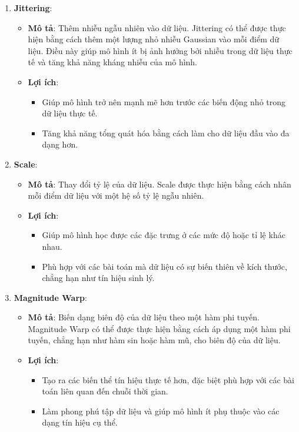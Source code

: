 \begin{enumerate}

\item \textbf{Jittering}: 
\begin{itemize}
\item \textbf{Mô tả}: Thêm nhiễu ngẫu nhiên vào dữ liệu. Jittering có thể được thực hiện bằng cách thêm một lượng nhỏ nhiễu Gaussian vào mỗi điểm dữ liệu. Điều này giúp mô hình ít bị ảnh hưởng bởi nhiễu trong dữ liệu thực tế và tăng khả năng kháng nhiễu của mô hình.
\item \textbf{Lợi ích}: 
\begin{itemize}
\item Giúp mô hình trở nên mạnh mẽ hơn trước các biến động nhỏ trong dữ liệu thực tế.
\item Tăng khả năng tổng quát hóa bằng cách làm cho dữ liệu đầu vào đa dạng hơn.
\end{itemize}
\end{itemize}

\item \textbf{Scale}: 
\begin{itemize}
\item \textbf{Mô tả}: Thay đổi tỷ lệ của dữ liệu. Scale được thực hiện bằng cách nhân mỗi điểm dữ liệu với một hệ số tỷ lệ ngẫu nhiên.
 \item \textbf{Lợi ích}:
\begin{itemize}
\item Giúp mô hình học được các đặc trưng ở các mức độ hoặc tỉ lệ khác nhau.
 \item Phù hợp với các bài toán mà dữ liệu có sự biến thiên về kích thước, chẳng hạn như tín hiệu sinh lý.
\end{itemize}
 \end{itemize}

\item \textbf{Magnitude Warp}: 
\begin{itemize}
\item \textbf{Mô tả}: Biến dạng biên độ của dữ liệu theo một hàm phi tuyến. Magnitude Warp có thể được thực hiện bằng cách áp dụng một hàm phi tuyến, chẳng hạn như hàm sin hoặc hàm mũ, cho biên độ của dữ liệu.
\item \textbf{Lợi ích}:
\begin{itemize}
\item Tạo ra các biến thể tín hiệu thực tế hơn, đặc biệt phù hợp với các bài toán liên quan đến chuỗi thời gian.
\item Làm phong phú tập dữ liệu và giúp mô hình ít phụ thuộc vào các dạng tín hiệu cụ thể.
 \end{itemize}
\end{itemize}


\end{enumerate}

